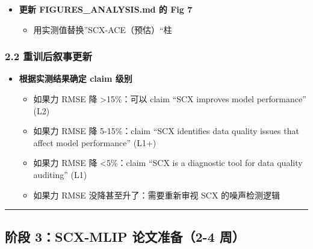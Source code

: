 \documentclass[
  12pt,
]{ctexart}
\providecommand{\tightlist}{%
  \setlength{\itemsep}{0pt}\setlength{\parskip}{0pt}}
\begin{document}
\begin{itemize}
  \begin{itemize}
  \tightlist
  \item
    在同一个 103 帧测试集上测力 RMSE、能量 RMSE
  \item
    报告 (a) vs (b) 的改善幅度（实测值，不是预估值！）
  \item
    展示 SCX 指导的 drop (a) 显著优于 random drop (c) 和 loss-based drop
    (d)
  \end{itemize}
\item[$\square$]
  \textbf{更新 FIGURES\_ANALYSIS.md 的 Fig 7}

  \begin{itemize}
  \tightlist
  \item
    用实测值替换''SCX-ACE（预估）``柱
  \end{itemize}
\end{itemize}

\subsubsection{2.2
重训后叙事更新}\label{ux91cdux8badux540eux53d9ux4e8bux66f4ux65b0}

\begin{itemize}
\tightlist
\item[$\square$]
  \textbf{根据实测结果确定 claim 级别}

  \begin{itemize}
  \tightlist
  \item
    如果力 RMSE 降 \textgreater15\%：可以 claim ``SCX improves model
    performance'' (L2)
  \item
    如果力 RMSE 降 5-15\%：claim ``SCX identifies data quality issues
    that affect model performance'' (L1+)
  \item
    如果力 RMSE 降 \textless5\%：claim ``SCX is a diagnostic tool for
    data quality auditing'' (L1)
  \item
    如果力 RMSE 没降甚至升了：需要重新审视 SCX 的噪声检测逻辑
  \end{itemize}
\end{itemize}

\begin{center}\rule{0.5\linewidth}{0.5pt}\end{center}

\subsection{阶段 3：SCX-MLIP 论文准备（2-4
周）}\label{ux9636ux6bb5-3scx-mlip-ux8bbaux6587ux51c6ux59072-4-ux5468}
\end{document}
